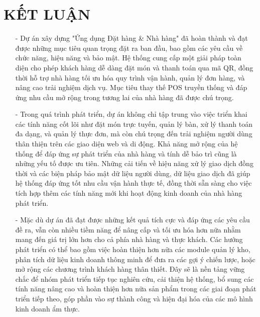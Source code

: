\documentclass[a4paper]{article}
\begin{document}
\section{KẾT LUẬN}
\begin{itemize}
    \item [-] Dự án xây dựng "Ứng dụng Đặt hàng & Nhà hàng" đã hoàn thành và đạt được những mục tiêu quan trọng đặt ra ban đầu, bao gồm các yêu cầu về chức năng, hiệu năng và bảo mật. Hệ thống cung cấp một giải pháp toàn diện cho phép khách hàng dễ dàng đặt món và thanh toán qua mã QR, đồng thời hỗ trợ nhà hàng tối ưu hóa quy trình vận hành, quản lý đơn hàng, và nâng cao trải nghiệm dịch vụ. Mục tiêu thay thế POS truyền thống và đáp ứng nhu cầu mở rộng trong tương lai của nhà hàng đã được chú trọng.
    \item [-] Trong quá trình phát triển, dự án không chỉ tập trung vào việc triển khai các tính năng cốt lõi như đặt món trực tuyến, quản lý bàn, xử lý thanh toán đa dạng, và quản lý thực đơn, mà còn chú trọng đến trải nghiệm người dùng thân thiện trên các giao diện web và di động. Khả năng mở rộng của hệ thống để đáp ứng sự phát triển của nhà hàng và tính dễ bảo trì cũng là những yếu tố được ưu tiên. Những cải tiến về hiệu năng xử lý giao dịch đồng thời và các biện pháp bảo mật dữ liệu người dùng, dữ liệu giao dịch đã giúp hệ thống đáp ứng tốt nhu cầu vận hành thực tế, đồng thời sẵn sàng cho việc tích hợp thêm các tính năng mới khi hoạt động kinh doanh của nhà hàng phát triển.
    \item [-] Mặc dù dự án đã đạt được những kết quả tích cực và đáp ứng các yêu cầu đề ra, vẫn còn nhiều tiềm năng để nâng cấp và tối ưu hóa hơn nữa nhằm mang đến giá trị lớn hơn cho cả phía nhà hàng và thực khách. Các hướng phát triển có thể bao gồm việc hoàn thiện hơn nữa các module quản lý kho, phân tích dữ liệu kinh doanh thông minh để đưa ra các gợi ý chiến lược, hoặc mở rộng các chương trình khách hàng thân thiết. Đây sẽ là nền tảng vững chắc để nhóm phát triển tiếp tục nghiên cứu, cải thiện hệ thống, bổ sung các tính năng nâng cao và hoàn thiện hơn nữa sản phẩm trong các giai đoạn phát triển tiếp theo, góp phần vào sự thành công và hiện đại hóa của các mô hình kinh doanh ẩm thực.
\end{itemize}


\newpage
\end{document}
